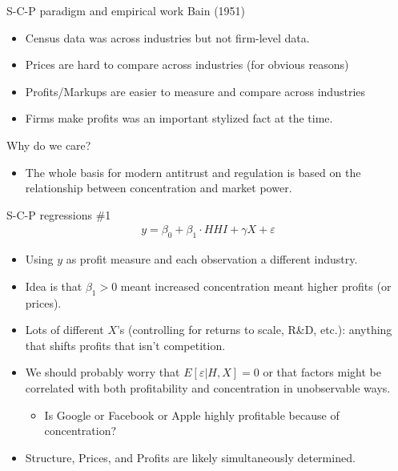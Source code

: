 \documentclass[aspectratio=169,11pt]{beamer}
\begin{document}
\begin{frame}{S-C-P paradigm and empirical work}
Bain (1951)
\begin{itemize}
\item Census data was across industries but not firm-level data.
\item Prices are hard to compare across industries (for obvious reasons)
\item Profits/Markups are easier to measure and compare across industries
\item Firms make profits was an important stylized fact at the time.
\end{itemize}
Why do we care?
\begin{itemize}
\item The whole basis for modern antitrust and regulation is based on the relationship between concentration and market power.
\end{itemize}
\end{frame}

\begin{frame}{S-C-P regressions \#1}
\begin{eqnarray*}
y = \beta_0 + \beta_1 \cdot HHI + \gamma X +  \varepsilon
\end{eqnarray*}

\begin{itemize}
\item Using $y$ as profit measure and each observation a different industry.
\item Idea is that $\beta_1 > 0$ meant increased concentration meant higher profits (or prices).
\item Lots of different $X$'s (controlling for returns to scale, R\&D, etc.): anything that shifts profits that isn't competition.
\item We should probably worry that $E[\varepsilon | H, X ] = 0$ or that factors might be correlated with both profitability and concentration in unobservable ways.
\begin{itemize}
\item Is Google or Facebook or Apple highly profitable because of concentration?
\end{itemize}
\item Structure, Prices, and Profits are likely simultaneously determined.
\end{itemize}
\end{frame}
\end{document}

